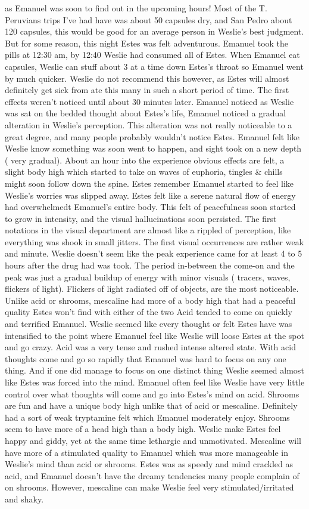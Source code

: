 \documentclass[12pt]{book}
\begin{document}
as Emanuel was soon to find out in the upcoming hours! Most of the T. Peruvians trips I've had have was about 50 capsules dry, and San Pedro about 120 capsules, this would be good for an average person in Weslie's best judgment. But for some reason, this night Estes was felt adventurous. Emanuel took the pills at 12:30 am, by 12:40 Weslie had consumed all of Estes. When Emanuel eat capsules, Weslie can stuff about 3 at a time down Estes's throat so Emanuel went by much quicker. Weslie do not recommend this however, as Estes will almost definitely get sick from ate this many in such a short period of time. The first effects weren't noticed until about 30 minutes later. Emanuel noticed as Weslie was sat on the bedded thought about Estes's life, Emanuel noticed a gradual alteration in Weslie's perception. This alteration was not really noticeable to a great degree, and many people probably wouldn't notice Estes. Emanuel felt like Weslie know something was soon went to happen, and sight took on a new depth ( very gradual). About an hour into the experience obvious effects are felt, a slight body high which started to take on waves of euphoria, tingles \& chills might soon follow down the spine. Estes remember Emanuel started to feel like Weslie's worries was slipped away. Estes felt like a serene natural flow of energy had overwhelmedt Emanuel's entire body. This felt of peacefulness soon started to grow in intensity, and the visual hallucinations soon persisted. The first notations in the visual department are almost like a rippled of perception, like everything was shook in small jitters. The first visual occurrences are rather weak and minute. Weslie doesn't seem like the peak experience came for at least 4 to 5 hours after the drug had was took. The period in-between the come-on and the peak was just a gradual buildup of energy with minor visuals ( tracers, waves, flickers of light). Flickers of light radiated off of objects, are the most noticeable. Unlike acid or shrooms, mescaline had more of a body high that had a peaceful quality Estes won't find with either of the two Acid tended to come on quickly and terrified Emanuel. Weslie seemed like every thought or felt Estes have was intensified to the point where Emanuel feel like Weslie will loose Estes at the spot and go crazy. Acid was a very tense and rushed intense altered state. With acid thoughts come and go so rapidly that Emanuel was hard to focus on any one thing. And if one did manage to focus on one distinct thing Weslie seemed almost like Estes was forced into the mind. Emanuel often feel like Weslie have very little control over what thoughts will come and go into Estes's mind on acid. Shrooms are fun and have a unique body high unlike that of acid or mescaline. Definitely had a sort of weak tryptamine felt which Emanuel moderately enjoy. Shrooms seem to have more of a head high than a body high. Weslie make Estes feel happy and giddy, yet at the same time lethargic and unmotivated. Mescaline will have more of a stimulated quality to Emanuel which was more manageable in Weslie's mind than acid or shrooms. Estes was as speedy and mind crackled as acid, and Emanuel doesn't have the dreamy tendencies many people complain of on shrooms. However, mescaline can make Weslie feel very stimulated/irritated and shaky. 
\end{document}
